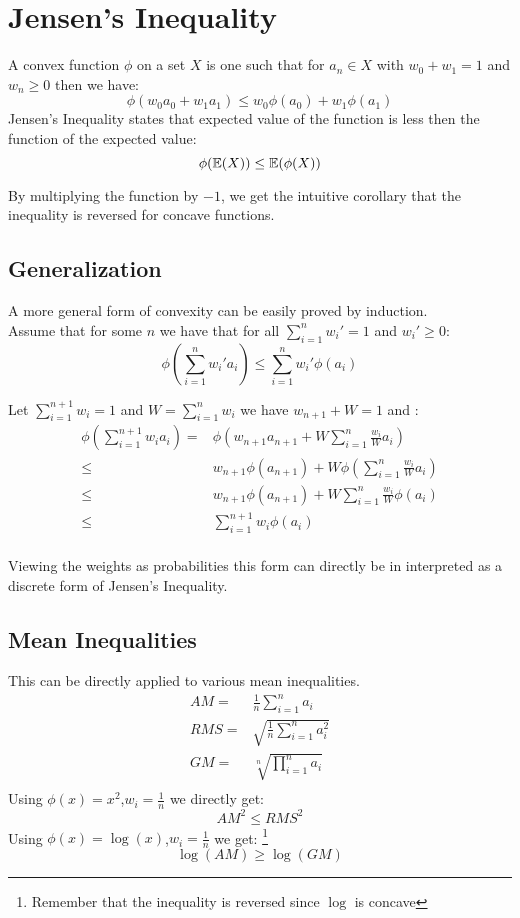 
\section{Jensen's Inequality}
A convex function $\phi$ on a set $X$ is one such that for $a_n\in X$ with $w_0+w_1 =1$ and $w_n \geq 0$ then we have:
\[\phi(w_0a_0+w_1a_1) \leq w_0\phi(a_0)+w_1\phi(a_1)\]
Jensen's Inequality states that expected value of the function is less then the function of the expected value:
\[\phi(\operatorname{\mathbb{E}}(X)) \leq \operatorname{\mathbb{E}}(\phi(X))\]

By multiplying the function by $-1$, we get the intuitive corollary that the inequality is reversed for concave functions.

\subsection{Generalization}
A more general form of convexity can be easily proved by induction.
\\

Assume that for some $n$ we have that for all $\sum_{i=1}^nw_i'=1$ and $w_i' \geq 0$:
\[\phi\left(\sum_{i=1}^nw_i'a_i\right) \leq \sum_{i=1}^nw_i'\phi(a_i)\]

Let $\sum_{i=1}^{n+1}w_i=1$ and $W = \sum_{i=1}^nw_i$ we have $w_{n+1}+W = 1$ and :
\begin{equation*}
\begin{aligned}
\phi\left(\sum_{i=1}^{n+1}w_ia_i\right) =&\phi\left(w_{n+1}a_{n+1}+W\sum_{i=1}^{n}\frac{w_i}{W}a_i\right) \\
\leq& w_{n+1}\phi(a_{n+1})+W\phi\left(\sum_{i=1}^{n}\frac{w_i}{W}a_i\right) \\
\leq& w_{n+1}\phi(a_{n+1})+W\sum_{i=1}^n\frac{w_i}{W}\phi(a_i) \\
\leq& \sum_{i=1}^{n+1}w_i\phi(a_i) \\
\end{aligned}
\end{equation*}

Viewing the weights as probabilities this form can directly be in interpreted as a discrete form of Jensen's Inequality.

\subsection{Mean Inequalities}
This can be directly applied to various mean inequalities.
\begin{equation*}
\begin{aligned}
	AM =& \frac{1}{n}\sum_{i=1}^{n}a_i \\
	RMS =& \sqrt{\frac{1}{n}\sum_{i=1}^na_i^2} \\
	GM =& \sqrt[n]{\prod_{i=1}^na_i}\\
\end{aligned}
\end{equation*}
Using $\phi(x)=x^2$,$w_i = \frac{1}{n}$ we directly get:
\[AM^2 \leq RMS^2\]
Using $\phi(x)=\log(x)$,$w_i = \frac{1}{n}$ we get:
\footnote{Remember that the inequality is reversed since $\log$ is concave}
\[\log(AM) \geq \log(GM)\]

